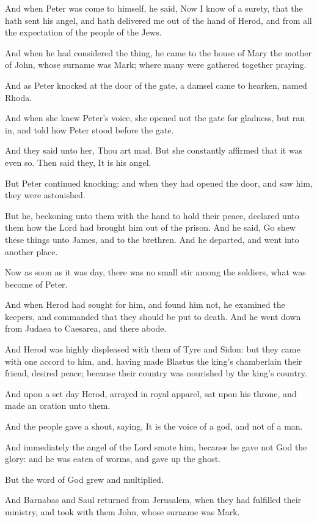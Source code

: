\verse And when Peter was come to himself, he said, Now I know of a surety, that the \LORD hath sent his angel, and hath delivered me out of the hand of Herod, and from all the expectation of the people of the Jews.

\verse And when he had considered the thing, he came to the house of Mary the mother of John, whose surname was Mark; where many were gathered together praying.

\verse And as Peter knocked at the door of the gate, a damsel came to hearken, named Rhoda.

\verse And when she knew Peter's voice, she opened not the gate for gladness, but ran in, and told how Peter stood before the gate.

\verse And they said unto her, Thou art mad. But she constantly affirmed that it was even so. Then said they, It is his angel.

\verse But Peter continued knocking: and when they had opened the door, and saw him, they were astonished.

\verse But he, beckoning unto them with the hand to hold their peace, declared unto them how the Lord had brought him out of the prison. And he said, Go shew these things unto James, and to the brethren. And he departed, and went into another place.

\verse Now as soon as it was day, there was no small stir among the soldiers, what was become of Peter.

\verse And when Herod had sought for him, and found him not, he examined the keepers, and commanded that they should be put to death.  And he went down from Judaea to Caesarea, and there abode.

\verse And Herod was highly displeased with them of Tyre and Sidon: but they came with one accord to him, and, having made Blastus the king's chamberlain their friend, desired peace; because their country was nourished by the king's country.

\verse And upon a set day Herod, arrayed in royal apparel, sat upon his throne, and made an oration unto them.

\verse And the people gave a shout, saying, It is the voice of a god, and not of a man.

\verse And immediately the angel of the Lord smote him, because he gave not God the glory: and he was eaten of worms, and gave up the ghost.

\verse But the word of God grew and multiplied.

\verse And Barnabas and Saul returned from Jerusalem, when they had fulfilled their ministry, and took with them John, whose surname was Mark.


